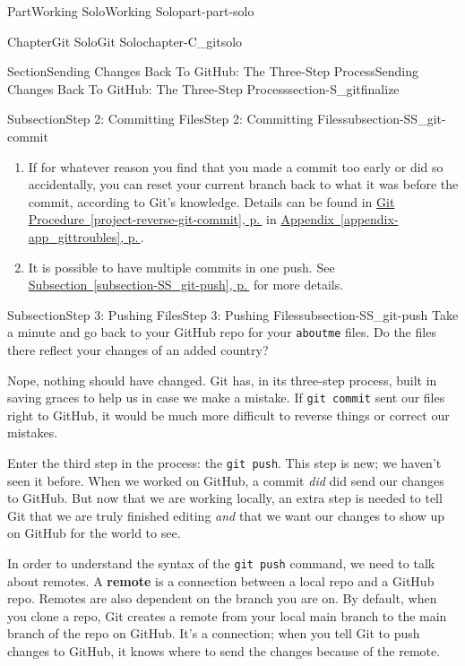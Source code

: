 \documentclass[twoside,10pt,]{book}
\newcommand{\xreffont}{\relax}
\newcommand{\mono}[1]{\texttt{#1}}
\newcommand{\terminology}[1]{\textbf{#1}}
\begin{document}
\begin{partptx}{Part}{Working Solo}{}{Working Solo}{}{}{part-part-solo}
\begin{chapterptx}{Chapter}{Git Solo}{}{Git Solo}{}{}{chapter-C_gitsolo}
\begin{sectionptx}{Section}{Sending Changes Back To GitHub: The Three-Step Process}{}{Sending Changes Back To GitHub: The Three-Step Process}{}{}{section-S_gitfinalize}
\begin{subsectionptx}{Subsection}{Step 2: Committing Files}{}{Step 2: Committing Files}{}{}{subsection-SS_git-commit}
\begin{enumerate}
\item{}If for whatever reason you find that you made a commit too early or did so accidentally, you can reset your current branch back to what it was before the commit, according to Git's knowledge. Details can be found in \hyperref[project-reverse-git-commit]{Git Procedure~{\xreffont\ref{project-reverse-git-commit}}, p.\,\pageref{project-reverse-git-commit}} in \hyperref[appendix-app_gittroubles]{Appendix~{\xreffont\ref{appendix-app_gittroubles}}, p.\,\pageref{appendix-app_gittroubles}}.%
\item{}It is possible to have multiple commits in one push. See \hyperref[subsection-SS_git-push]{Subsection~{\xreffont\ref{subsection-SS_git-push}}, p.\,\pageref{subsection-SS_git-push}} for more details.%
\end{enumerate}
%
\end{subsectionptx}
%
%
\typeout{************************************************}
\typeout{************************************************}
%
\begin{subsectionptx}{Subsection}{Step 3: Pushing Files}{}{Step 3: Pushing Files}{}{}{subsection-SS_git-push}
%
%
%
%
%
%
Take a minute and go back to your GitHub repo for your \mono{aboutme} files. Do the files there reflect your changes of an added country?%
\par
Nope, nothing should have changed. Git has, in its three-step process, built in saving graces to help us in case we make a mistake. If \mono{git commit} sent our files right to GitHub, it would be much more difficult to reverse things or correct our mistakes.%
\par
Enter the third step in the process: the \mono{git push}. This step is new; we haven't seen it before. When we worked on GitHub, a commit \emph{did} did send our changes to GitHub. But now that we are working locally, an extra step is needed to tell Git that we are truly finished editing \emph{and} that we want our changes to show up on GitHub for the world to see.%
\par
In order to understand the syntax of the \mono{git push} command, we need to talk about remotes. A \terminology{remote} is a connection between a local repo and a GitHub repo. Remotes are also dependent on the branch you are on. By default, when you clone a repo, Git creates a remote from your local main branch to the main branch of the repo on GitHub. It's a connection; when you tell Git to push changes to GitHub, it knows where to send the changes because of the remote.%

\end{subsectionptx}
\end{sectionptx}
\end{chapterptx}
\end{partptx}
\end{document}
